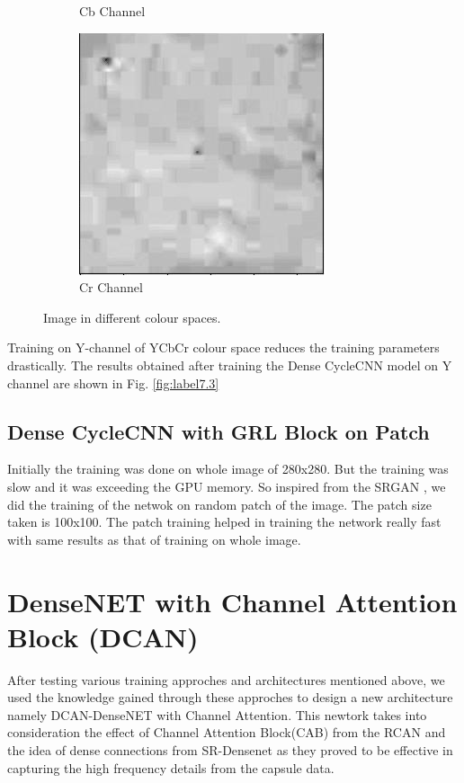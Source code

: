 \begin{figure}[H]
\begin{subfigure}[b]{0.3\textwidth}
    \caption{Cb Channel}
  \end{subfigure}
  \begin{subfigure}[b]{0.3\textwidth}
    \includegraphics[width=\textwidth]{Chapter6/CR_9.png}
    \caption{Cr Channel}
  \end{subfigure}
    
    \caption[Image in different colour spaces.]{Image in different colour spaces.}
    \label{fig:label6.6}
\end{figure}
Training on Y-channel of YCbCr colour space reduces the training parameters drastically. The results obtained after training the Dense CycleCNN model on Y channel are shown in Fig. \ref{fig:label7.3}
\subsection{Dense CycleCNN with GRL Block on Patch}
Initially the training was done on whole image of 280x280. But the training was slow and it was exceeding the GPU memory. So inspired from the SRGAN \cite{SRGAN}, we did the training of the netwok on random patch of the image. The patch size taken is 100x100.
The patch training helped in training the network really fast with same results as that of training on whole image.
\newpage
\section{DenseNET with Channel Attention Block (DCAN)}
After testing various training approches and architectures mentioned above, we used the knowledge gained through these approches to design a new architecture namely DCAN-DenseNET with Channel Attention. This newtork takes into consideration the effect of Channel Attention Block(CAB) from the RCAN{\cite{RCAN}} and the idea of dense connections from SR-Densenet{\cite{DenseNET}} as they proved to be effective in capturing the high frequency details from the capsule data.


